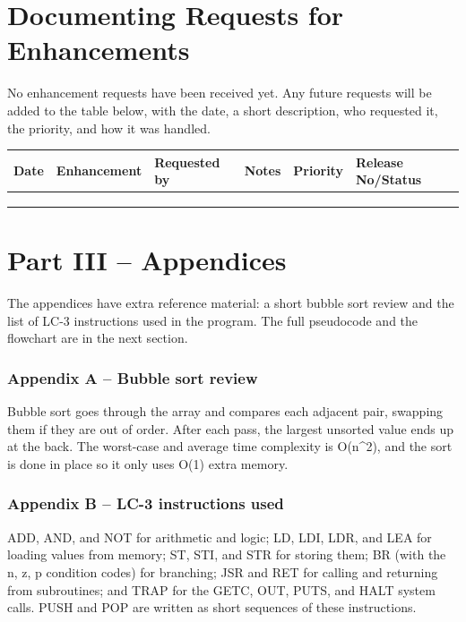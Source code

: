 \documentclass[11pt]{article}
\begin{document}
\section*{Documenting Requests for Enhancements}

No enhancement requests have been received yet. Any future requests will be added to the table below, with the date, a short description, who requested it, the priority, and how it was handled.


\begin{center}
\small
\begin{tabularx}{\textwidth}{|X|X|X|X|X|X|}
\hline
\textbf{Date} & \textbf{Enhancement} & \textbf{Requested by} & \textbf{Notes} & \textbf{Priority} & \textbf{Release No/Status} \\
\hline
 & & & & & \\[1.5em]
\hline
 & & & & & \\[1.5em]
\hline
 & & & & & \\[1.5em]
\hline
\end{tabularx}
\end{center}


\section*{Part III -- Appendices}

The appendices have extra reference material: a short bubble sort review and the list of LC-3 instructions used in the program. The full pseudocode and the flowchart are in the next section.


\subsubsection*{Appendix A -- Bubble sort review}

Bubble sort goes through the array and compares each adjacent pair, swapping them if they are out of order. After each pass, the largest unsorted value ends up at the back. The worst-case and average time complexity is O(n\textasciicircum{}2), and the sort is done in place so it only uses O(1) extra memory.


\subsubsection*{Appendix B -- LC-3 instructions used}

ADD, AND, and NOT for arithmetic and logic; LD, LDI, LDR, and LEA for loading values from memory; ST, STI, and STR for storing them; BR (with the n, z, p condition codes) for branching; JSR and RET for calling and returning from subroutines; and TRAP for the GETC, OUT, PUTS, and HALT system calls. PUSH and POP are written as short sequences of these instructions.
\end{document}
